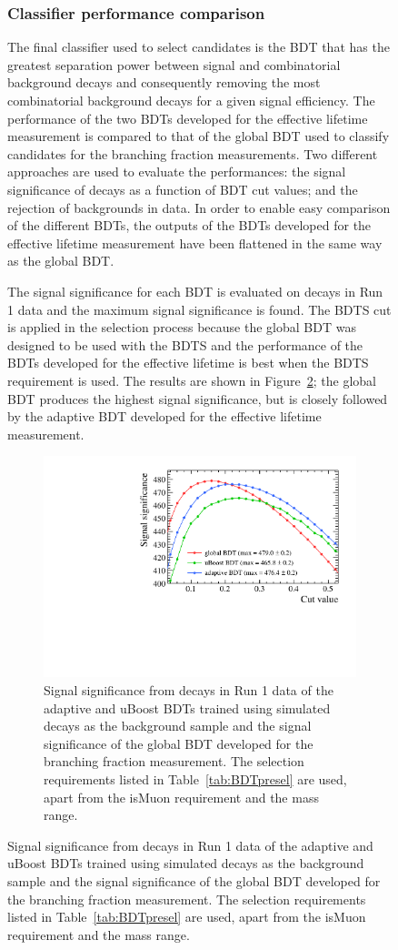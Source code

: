 \begin{figure}[tbp]
\subsubsection{Classifier performance comparison}

The final classifier used to select \bsmumu candidates is the BDT that has the greatest separation power between signal and combinatorial background decays and consequently removing the most combinatorial background decays for a given signal efficiency. The performance of the two BDTs developed for the effective lifetime measurement is compared to that of the global BDT used to classify candidates for the branching fraction measurements. Two different approaches are used to evaluate the performances: the signal significance of \bhh decays as a function of BDT cut values; and the rejection of \bsmumu backgrounds in data. In order to enable easy comparison of the different BDTs, the outputs of the BDTs developed for the effective lifetime measurement have been flattened in the same way as the global BDT. %

The signal significance for each BDT is evaluated on \bhh decays in Run 1 data and the maximum signal significance is found. The BDTS cut is applied in the selection process because the global BDT was designed to be used with the BDTS and the performance of the BDTs developed for the effective lifetime is best when the BDTS requirement is used. The results are shown in Figure~\ref{fig:SSall}; the global BDT produces the highest signal significance, but is closely followed by the adaptive BDT developed for the effective lifetime measurement. 

\begin{figure}[htbp]
    \centering
        \includegraphics[width=0.6 \textwidth]{./Figs/Selection/BDT_comp_zoom.pdf}
    \caption{Signal significance from \bhh decays in Run 1 data of the adaptive and uBoost BDTs trained using simulated decays as the background sample and the signal significance of the global BDT developed for the branching fraction measurement. The selection requirements listed in Table~\ref{tab:BDTpresel} are used, apart from the isMuon requirement and the mass range. }
    \label{fig:SSall}
\end{figure}



\end{figure}
